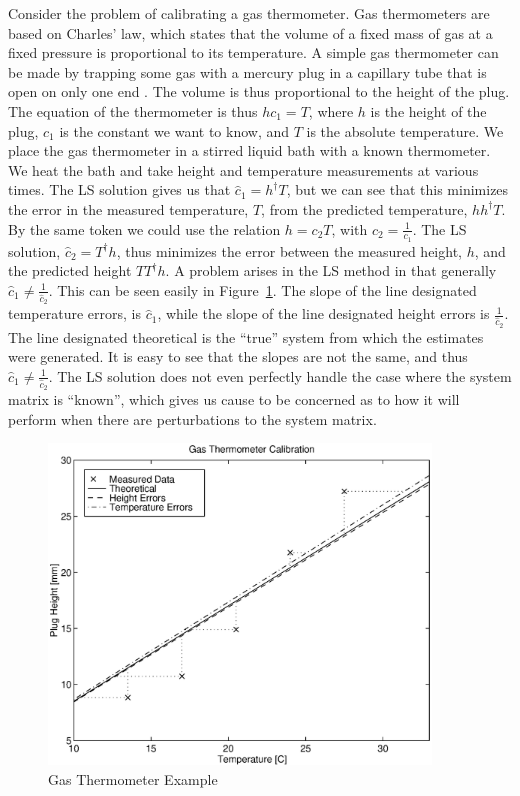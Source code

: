 Consider the problem of calibrating a gas thermometer.  Gas thermometers are based on Charles' law, which states that the volume of a fixed mass of gas at a fixed pressure is proportional to its temperature.  A simple gas thermometer can be made by trapping some gas with a mercury plug in a capillary tube that is open on only one end .  The volume is thus proportional to the height of the plug.  The equation of the thermometer is thus $hc_{1}=T$, where $h$ is the height of the plug, $c_{1}$ is the constant we want to know, and $T$ is the absolute temperature.  We place the gas thermometer in a stirred liquid bath with a known thermometer.  We heat the bath and take height and temperature measurements at various times.  The LS solution gives us that $\hat c_{1}=h^{\dagger}T$, but we can see that this minimizes the error in the measured temperature, $T$, from the predicted temperature, $hh^{\dagger}T$.  By the same token we could use the relation $h=c_{2}T$, with $c_{2}=\frac{1}{c_{1}}$.  The LS solution, $\hat c_{2}=T^{\dagger}h$, thus minimizes the error between the measured height, $h$, and the predicted height $TT^{\dagger}h$.  A problem arises in the LS method in that generally $\hat c_{1}\ne\frac{1}{\hat c_{2}}$.  This can be seen easily in Figure~\ref{gastherm}.  The slope of the line designated temperature errors, is $\hat c_{1}$, while the slope of the line designated height errors is $\frac{1}{\hat c_{2}}$.  The line designated theoretical is the ``true'' system from which the estimates were generated.  It is easy to see that the slopes are not the same, and thus $\hat c_{1}\ne\frac{1}{\hat c_{2}}$.  The LS solution does not even perfectly handle the case where the system matrix is ``known'', which gives us cause to be concerned as to how it will perform when there are perturbations to the system matrix.

\begin{figure}[h]
\begin{center}
\includegraphics[width=4in]{gastherm.eps}
\end{center}
\caption{Gas Thermometer Example}
\label{gastherm}
\end{figure}


